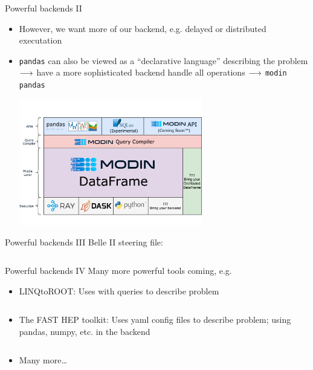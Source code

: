 \begin{frame}{Powerful backends II}
	\begin{itemize}
		\item However, we want more of our backend, e.g. delayed or distributed executation
		\item \texttt{pandas} can also be viewed as a \enquote{declarative language} describing the problem $\longrightarrow$ have a more sophisticated backend handle all operations $\longrightarrow$ \texttt{modin pandas}
		
		\includegraphics[width=8cm, trim=0cm 2.5cm 0cm 2.5cm, clip]{figures/paradigms/dp/modin_architecture.png}
	\end{itemize}
\end{frame}
%
\begin{frame}{Powerful backends III}
	Belle II steering file:
	\inputminted{python}{code/paradigms/dp/belle2_steering_file.py}
\end{frame}
%
\begin{frame}{Powerful backends IV}
	Many more powerful tools coming, e.g.
	\smallskip 
	\begin{itemize}
		\item LINQtoROOT: Uses  with  queries to describe problem
		\inputminted[fontsize=\small]{csharp}{code/paradigms/dp/linqtoroot.cs}
		\item The FAST HEP toolkit: Uses yaml config files to describe problem; using pandas, numpy, etc. in the backend
		\inputminted[fontsize=\small]{yaml}{code/paradigms/dp/fast.yaml}
		\item Many more\dots
	\end{itemize}
\end{frame}